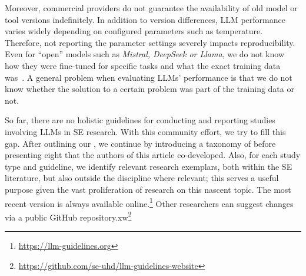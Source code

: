 Moreover, commercial providers do not guarantee the availability of old model or tool versions indefinitely.
In addition to version differences, LLM performance varies widely depending on configured parameters such as temperature.
Therefore, not reporting the parameter settings severely impacts reproducibility.
Even for ``open'' models such as \emph{Mistral, DeepSeek or Llama}, we do not know how they were fine-tuned for specific tasks and what the exact training data was~\cite{Gibney2024}.
A general problem when evaluating LLMs' performance is that we do not know whether the solution to a certain problem was part of the training data or not.

So far, there are no holistic guidelines for conducting and reporting studies involving LLMs in SE research.
With this community effort, we try to fill this gap.
After outlining our \scope, we continue by introducing a taxonomy of \studytypes before presenting eight \guidelines that the authors of this article co-developed.
Also, for each study type and guideline, we identify relevant research exemplars, both within the SE literature, but also outside the discipline where relevant; this serves a useful purpose given the vast proliferation of research on this nascent topic.
The most recent version is always available online.\footnote{\url{https://llm-guidelines.org}}
Other researchers can suggest changes via a public GitHub repository.xw\footnote{\url{https://github.com/se-uhd/llm-guidelines-website}}
